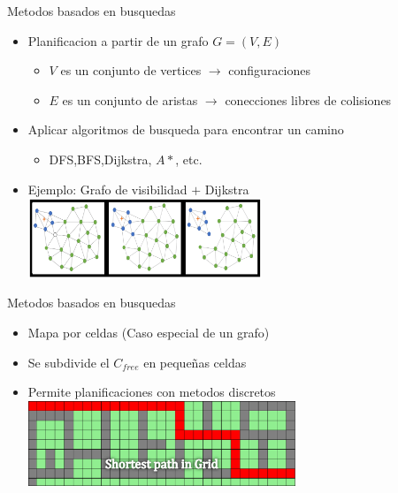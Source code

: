 \documentclass[
	11pt, %
]{beamer}
\begin{document}
\begin{frame}{Metodos basados en busquedas}
  \begin{itemize}
  \item Planificacion a partir de un grafo $G=(V,E)$\\
    \begin{itemize}
    \item $V$ es un conjunto de vertices $\rightarrow$ configuraciones
    \item $E$ es un conjunto de aristas $\rightarrow$ conecciones libres de colisiones
    \end{itemize}
  \item Aplicar algoritmos de busqueda para encontrar un camino\\
    \begin{itemize}
    \item DFS,BFS,Dijkstra, $A*$, etc.
    \end{itemize}
  \item Ejemplo: Grafo de visibilidad $+$ Dijkstra\\
    \centering
    \bigskip %
    \includegraphics[width=7cm]{graph_robot}
  \end{itemize}
\end{frame}

\begin{frame}{Metodos basados en busquedas}
  \begin{itemize}
  \item Mapa por celdas (Caso especial de un grafo)\\
  \item Se subdivide el $C_{free}$ en pequeñas celdas\\
  \item Permite planificaciones con metodos discretos\\
    \centering
    \bigskip %
    \includegraphics[width=8cm]{bfs.jpg}
  \end{itemize}
\end{frame}
\end{document}
